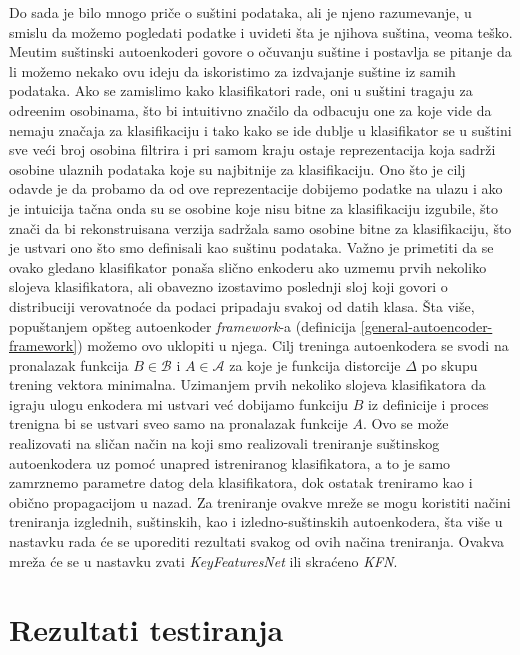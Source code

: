 \documentclass{article}
\let\oldsection\section
\renewcommand\section{\clearpage\oldsection}
\begin{document}
	Do sada je bilo mnogo pri\v ce o su\v stini podataka, ali je njeno razumevanje, u smislu da mo\v zemo pogledati podatke i uvideti \v sta je njihova su\v stina, veoma te\v sko.
	Me\dj utim su\v stinski autoenkoderi govore o o\v cuvanju su\v stine i postavlja se pitanje da li mo\v zemo nekako ovu ideju da iskoristimo za izdvajanje su\v stine iz samih podataka.
	Ako se zamislimo kako klasifikatori rade, oni u su\v stini tragaju za odre\dj enim osobinama, \v sto bi intuitivno zna\v cilo da odbacuju one za koje vide da nemaju zna\v caja za klasifikaciju i tako kako se ide dublje u klasifikator se u su\v stini sve ve\'ci broj osobina filtrira i pri samom kraju ostaje reprezentacija koja sadr\v zi osobine ulaznih podataka koje su najbitnije za klasifikaciju.
	Ono \v sto je cilj odavde je da probamo da od ove reprezentacije dobijemo podatke na ulazu i ako je intuicija ta\v cna onda su se osobine koje nisu bitne za klasifikaciju izgubile, \v sto zna\v ci da bi rekonstruisana verzija sadr\v zala samo osobine bitne za klasifikaciju, \v sto je ustvari ono \v sto smo definisali kao su\v stinu podataka.
	Va\v zno je primetiti da se ovako gledano klasifikator pona\v sa sli\v cno enkoderu ako uzmemu prvih nekoliko slojeva klasifikatora, ali obavezno izostavimo poslednji sloj koji govori o distribuciji verovatno\'ce da  podaci pripadaju svakoj od datih klasa. 
	\v Sta vi\v se, popu\v stanjem op\v steg autoenkoder \textit{framework}-a (definicija \ref{general-autoencoder-framework}) mo\v zemo ovo uklopiti u njega.
	Cilj treninga autoenkodera se svodi na pronalazak funkcija $B \in \mathcal{B}$ i $A \in \mathcal{A}$ za koje je funkcija distorcije $\Delta$ po skupu trening vektora minimalna.
	Uzimanjem prvih nekoliko slojeva klasifikatora da igraju ulogu enkodera mi ustvari ve\'c dobijamo funkciju $B$ iz definicije i proces trenigna bi se ustvari sveo samo na pronalazak funkcije $A$. 
	Ovo se mo\v ze realizovati na sli\v can na\v cin na koji smo realizovali treniranje su\v stinskog autoenkodera uz pomo\'c unapred istreniranog klasifikatora, a to je samo zamrznemo parametre datog dela klasifikatora, dok ostatak treniramo kao i obi\v cno propagacijom u nazad.
	Za treniranje ovakve mre\v ze se mogu koristiti na\v cini treniranja izglednih, su\v stinskih, kao i izledno-su\v stinskih autoenkodera, \v sta vi\v se u nastavku rada \'ce se uporediti rezultati svakog od ovih na\v cina treniranja.
	Ovakva mre\v za \'ce se u nastavku zvati \emph{KeyFeaturesNet} ili skra\'ceno \emph{KFN}.
	
	
	\section{Rezultati testiranja}
	
\end{document}
